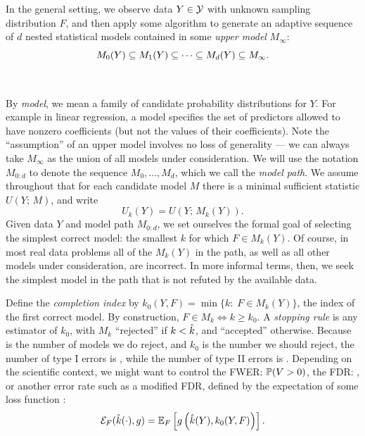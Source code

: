 \documentclass{article}
\begin{document}
In the general setting, we observe data $Y \in \cY$ with unknown sampling distribution $F$, and then apply some algorithm to generate an adaptive sequence of $d$ nested statistical models contained in some {\em upper model} $M_{\infty}$:
\[
M_0(Y) \sub M_1(Y) \sub \cdots \sub M_d(Y) \sub M_\infty.
\]
 \\
\\
By {\em model}, we mean a family of candidate probability distributions for $Y$. For example in  linear regression, a model specifies  the set of
predictors allowed to have nonzero coefficients (but not the  values of their coefficients). Note the ``assumption'' of an upper model involves no loss of generality --- we can always take $M_\infty$ as the union of all models under consideration. We will use the notation $M_{0:d}$ to denote the sequence $M_0, \ldots, M_d$, which we call the {\em model path}. We assume throughout that for each candidate model $M$ there is a minimal sufficient statistic $U(Y; \,M)$, and write
\[
U_k(Y) = U(Y; \,M_k(Y)).
\]
Given data $Y$ and model path $M_{0:d}$, we set ourselves the formal goal of selecting the simplest correct model: the smallest $k$ for which $F\in M_k(Y)$. Of course, in most real data problems all of the $M_k(Y)$ in the path, as well as all other models under consideration, are incorrect. In more informal terms, then, we seek the simplest model in the path that is not refuted by the available data.

Define the {\em completion index} by $k_0(Y, F) = \min\{k:\; F \in M_k(Y)\}$, the index of the first correct model. By construction, $F\in M_k \iff k \geq k_0$. A {\em stopping rule} is any estimator \smash{$\hk$} of $k_0$, with $M_k$ ``rejected'' if $k < \hk$, and ``accepted'' otherwise. Because \smash{$\hk$} is the number of models we do reject, and $k_0$ is the number we should reject, the number of type I errors is , while the number of type II errors is . Depending on the scientific context, we might want to control the FWER: $\P(V>0)$, the FDR: \smash{$\E[V/\hk; \hk>0]$}, or another error rate such as a modified FDR, defined by the expectation of some loss function :
\begin{equation}\label{eq:errRate}
\Err_F(\hk(\cdot), g) = \E_F\left[ g\left(\hk(Y), k_0(Y, F)\right)\right].
\end{equation}
\end{document}
